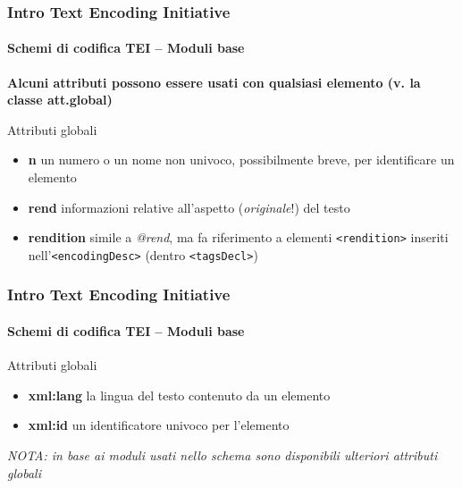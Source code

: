 



\begin{frame}
	\frametitle{Intro Text Encoding Initiative}
	\framesubtitle{Schemi di codifica TEI – Moduli base}
	\addtocounter{nframe}{1}

    \textbf{Alcuni attributi possono essere usati con qualsiasi elemento (v. la classe att.global)}

    \begin{block}{ Attributi globali}
        \begin{itemize}
            \item \textbf{n} un numero o un nome non univoco, possibilmente breve, per identificare un elemento
            \item \textbf{rend} informazioni relative all’aspetto (\textit{originale}!) del testo
            \item \textbf{rendition} simile a \textit{@rend}, ma fa riferimento a elementi
            \texttt{<rendition>} inseriti nell’\texttt{<encodingDesc>} (dentro \texttt{<tagsDecl>})
        \end{itemize}
    \end{block}
\end{frame}

\begin{frame}
	\frametitle{Intro Text Encoding Initiative}
	\framesubtitle{Schemi di codifica TEI – Moduli base}
	\addtocounter{nframe}{1}

    \begin{block}{ Attributi globali}
        \begin{itemize}
            \item \textbf{xml:lang} la lingua del testo contenuto da un elemento
            \item \textbf{xml:id} un identificatore univoco per l’elemento
        \end{itemize}
       \textit{NOTA: in base ai moduli usati nello schema sono disponibili ulteriori attributi globali}
    \end{block}
\end{frame}

